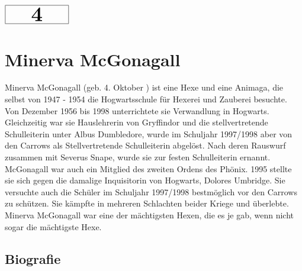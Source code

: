 \documentclass[a4paper, 10pt]{article}
\begin{document}
\begin{minipage}[t]{\textwidth}
    \vspace*{-1.5cm} %
    \begin{flushright}
        \hspace*{\fill} %
        $\boxed{\textbf{\Huge\phantom{00}4\phantom{00}}}$ %
    \end{flushright}
\end{minipage}

\section*{\huge Minerva McGonagall}
Minerva McGonagall (geb. 4. Oktober ) ist eine Hexe und eine Animaga, die selbst von 1947 - 1954 die Hogwartsschule für Hexerei und Zauberei besuchte. Von Dezember 1956 bis 1998 unterrichtete sie Verwandlung in Hogwarts. Gleichzeitig war sie Hauslehrerin von Gryffindor und die stellvertretende Schulleiterin unter Albus Dumbledore, wurde im Schuljahr 1997/1998 aber von den Carrows als Stellvertretende Schulleiterin abgelöst. Nach deren Rauswurf zusammen mit Severus Snape, wurde sie zur festen Schulleiterin ernannt. McGonagall war auch ein Mitglied des zweiten Ordens des Phönix. 1995 stellte sie sich gegen die damalige Inquisitorin von Hogwarts, Dolores Umbridge. Sie versuchte auch die Schüler im Schuljahr 1997/1998 bestmöglich vor den Carrows zu schützen. Sie kämpfte in mehreren Schlachten beider Kriege und überlebte.
\vspace{10pt}
\newline
Minerva McGonagall war eine der mächtigsten Hexen, die es je gab, wenn nicht sogar die mächtigste Hexe.
\subsection*{\Large Biografie}
\end{document}
